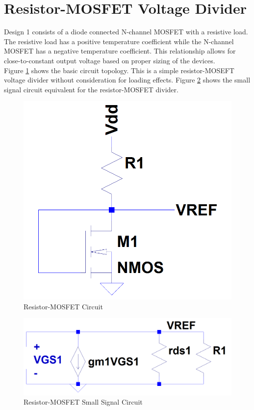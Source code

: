 \documentclass[conference]{IEEEtran}
\newcommand{\tab}{\hspace*{2em}}
\begin{document}
\section{Resistor-MOSFET Voltage Divider}
Design 1 consists of a diode connected N-channel MOSFET with a resistive load.  The resistive load has a positive temperature coefficient while the N-channel MOSFET has a negative temperature coefficient.  This relationship allows for close-to-constant output voltage based on proper sizing of the devices.\\\tab
Figure \ref{fig:resistor-mosfet1} shows the basic circuit topology.  This is a simple resistor-MOSEFT voltage divider without consideration for loading effects.  Figure \ref{fig:resistor-mosfet1-ss} shows the small signal circuit equivalent for the resistor-MOSFET divider.
\begin{figure}[!htbp]
  \centering
  \includegraphics[scale=0.25]{images/resistor-mosfet1.png}
  \caption[resistor1]{Resistor-MOSFET Circuit}
  \label{fig:resistor-mosfet1}
\end{figure}
\begin{figure}[!htbp]
  \centering
  \includegraphics[scale=0.25]{images/resistor-mosfet1-ss.png}
  \caption[resistor1-ss]{Resistor-MOSFET Small Signal Circuit}
  \label{fig:resistor-mosfet1-ss}
\end{figure}
\end{document}
